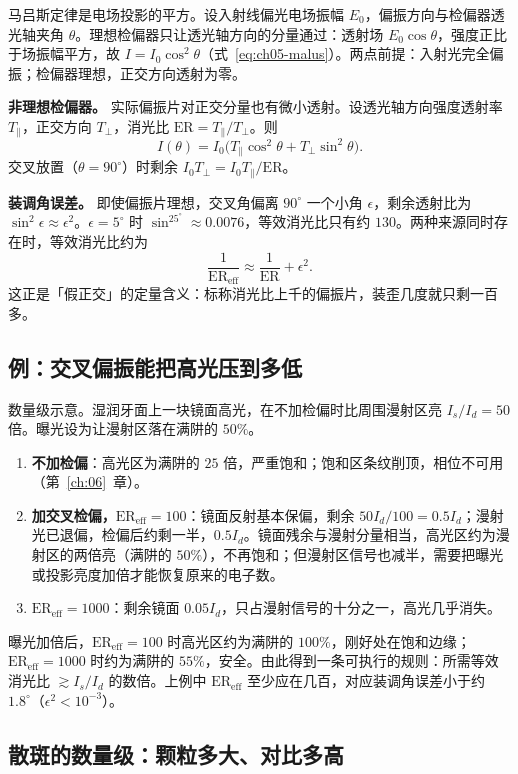 马吕斯定律是电场投影的平方。设入射线偏光电场振幅 $E_0$，偏振方向与检偏器透光轴夹角 $\theta$。理想检偏器只让透光轴方向的分量通过：透射场 $E_0\cos\theta$，强度正比于场振幅平方，故 $I=I_0\cos^2\theta$（式~\eqref{eq:ch05-malus}）。两点前提：入射光完全偏振；检偏器理想，正交方向透射为零。

\textbf{非理想检偏器。} 实际偏振片对正交分量也有微小透射。设透光轴方向强度透射率 $T_\parallel$，正交方向 $T_\perp$，消光比 $\mathrm{ER}=T_\parallel/T_\perp$。则
\[
  I(\theta)=I_0\bigl(T_\parallel\cos^2\theta+T_\perp\sin^2\theta\bigr).
\]
交叉放置（$\theta=90^\circ$）时剩余 $I_0T_\perp=I_0T_\parallel/\mathrm{ER}$。

\textbf{装调角误差。} 即使偏振片理想，交叉角偏离 $90^\circ$ 一个小角 $\epsilon$，剩余透射比为 $\sin^2\epsilon\approx\epsilon^2$。$\epsilon=5^\circ$ 时 $\sin^25^\circ\approx0.0076$，等效消光比只有约 $130$。两种来源同时存在时，等效消光比约为
\[
  \frac{1}{\mathrm{ER}_{\mathrm{eff}}}\approx\frac{1}{\mathrm{ER}}+\epsilon^2 .
\]
这正是「假正交」的定量含义：标称消光比上千的偏振片，装歪几度就只剩一百多。

\subsection{例：交叉偏振能把高光压到多低}

数量级示意。湿润牙面上一块镜面高光，在不加检偏时比周围漫射区亮 $I_s/I_d=50$ 倍。曝光设为让漫射区落在满阱的 $50\%$。
\begin{enumerate}
  \item \textbf{不加检偏}：高光区为满阱的 $25$ 倍，严重饱和；饱和区条纹削顶，相位不可用（第~\ref{ch:06}~章）。
  \item \textbf{加交叉检偏，$\mathrm{ER}_{\mathrm{eff}}=100$}：镜面反射基本保偏，剩余 $50I_d/100=0.5I_d$；漫射光已退偏，检偏后约剩一半，$0.5I_d$。镜面残余与漫射分量相当，高光区约为漫射区的两倍亮（满阱的 $50\%$），不再饱和；但漫射区信号也减半，需要把曝光或投影亮度加倍才能恢复原来的电子数。
  \item \textbf{$\mathrm{ER}_{\mathrm{eff}}=1000$}：剩余镜面 $0.05I_d$，只占漫射信号的十分之一，高光几乎消失。
\end{enumerate}
曝光加倍后，$\mathrm{ER}_{\mathrm{eff}}=100$ 时高光区约为满阱的 $100\%$，刚好处在饱和边缘；$\mathrm{ER}_{\mathrm{eff}}=1000$ 时约为满阱的 $55\%$，安全。由此得到一条可执行的规则：所需等效消光比 $\gtrsim I_s/I_d$ 的数倍。上例中 $\mathrm{ER}_{\mathrm{eff}}$ 至少应在几百，对应装调角误差小于约 $1.8^\circ$（$\epsilon^2<10^{-3}$）。

\subsection{散斑的数量级：颗粒多大、对比多高}

